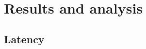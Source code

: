 \section{Results and analysis}
\label{sec:cniresuls}

\subsection{Latency}\label{subsec:results-latency}



